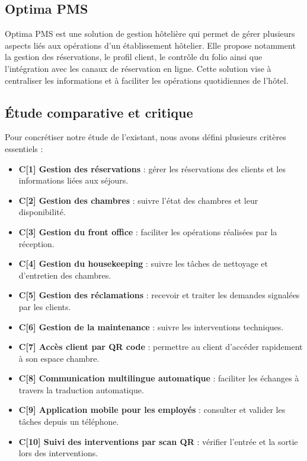 
\subsection{Optima PMS}
Optima PMS est une solution de gestion hôtelière qui permet de gérer plusieurs aspects liés aux opérations d'un établissement hôtelier. Elle propose notamment la gestion des réservations, le profil client, le contrôle du folio ainsi que l'intégration avec les canaux de réservation en ligne. Cette solution vise à centraliser les informations et à faciliter les opérations quotidiennes de l'hôtel.


\subsection{Étude comparative et critique}
Pour concrétiser notre étude de l'existant, nous avons défini plusieurs critères essentiels :
\begin{itemize}
    \item \textbf{C[1] Gestion des réservations} : gérer les réservations des clients et les informations liées aux séjours.
    \item \textbf{C[2] Gestion des chambres} : suivre l'état des chambres et leur disponibilité.
    \item \textbf{C[3] Gestion du front office} : faciliter les opérations réalisées par la réception.
    \item \textbf{C[4] Gestion du housekeeping} : suivre les tâches de nettoyage et d'entretien des chambres.
    \item \textbf{C[5] Gestion des réclamations} : recevoir et traiter les demandes signalées par les clients.
    \item \textbf{C[6] Gestion de la maintenance} : suivre les interventions techniques.
    \item \textbf{C[7] Accès client par QR code} : permettre au client d'accéder rapidement à son espace chambre.
    \item \textbf{C[8] Communication multilingue automatique} : faciliter les échanges à travers la traduction automatique.
    \item \textbf{C[9] Application mobile pour les employés} : consulter et valider les tâches depuis un téléphone.
    \item \textbf{C[10] Suivi des interventions par scan QR} : vérifier l'entrée et la sortie lors des interventions.
\end{itemize}

